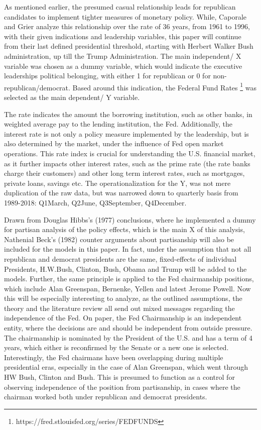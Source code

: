 \documentclass[11pt]{article}
\begin{document}
As mentioned earlier, the presumed casual relationship leads for republican candidates to implement tighter measures of monetary policy. While, Caporale and Grier analyze this relationship over the rate of 36 years, from 1961 to 1996, with their given indications and leadership variables, this paper will continue from their last defined presidential threshold, starting with Herbert Walker Bush administration, up till the Trump Administration. The main independent/ X variable was chosen as a dummy variable, which would indicate the executive leaderships political belonging, with either 1 for republican or 0 for non-republican/democrat. Based around this indication, the Federal Fund Rates \footnote{https://fred.stlouisfed.org/series/FEDFUNDS} was selected as the main dependent/ Y variable. \

The rate indicates the amount the borrowing institution, such as other banks, in weighted average pay to the lending institution, the Fed. Additionally, the interest rate is not only a policy measure implemented by the leadership, but is also determined by the market, under the influence of Fed open market operations. This rate index is crucial for understanding the U.S. financial market, as it further impacts other interest rates, such as the prime rate (the rate banks charge their customers) and other long term interest rates, such as mortgages, private loans, savings etc. The operationalization for the Y, was not mere duplication of the raw data, but was narrowed down to quarterly basis from 1989-2018: Q1March, Q2June, Q3September, Q4December.

Drawn from Douglas Hibbs's (1977) conclusions, where he implemented a dummy for partisan analysis of the policy effects, which is the main X of this analysis, Nathenial Beck's (1982) counter arguments about partisanship will also be included for the models in this paper. In fact, under the assumption that not all republican and democrat presidents are the same, fixed-effects of individual Presidents, H.W.Bush, Clinton, Bush, Obama and Trump will be added to the models. Further, the same principle is applied to the Fed chairmanship positions, which include Alan Greenspan, Bernenke, Yellen and latest Jerome Powell. Now this will be especially interesting to analyze, as the outlined assumptions, the theory and the literature review all send out mixed messages regarding the independence of the Fed. On paper, the Fed Chairmanship is an independent entity, where the decisions are and should be independent from outside pressure. The chairmanship is nominated by the President of the U.S. and has a term of 4 years, which either is reconfirmed by the Senate or a new one is selected. Interestingly, the Fed chairmans have been overlapping during multiple presidential eras, especially in the case of Alan Greenspan, which went through HW Bush, Clinton and Bush. This is presumed to function as a control for observing independence of the position from partisanship, in cases where the chairman worked both under republican and democrat presidents.
\end{document}
